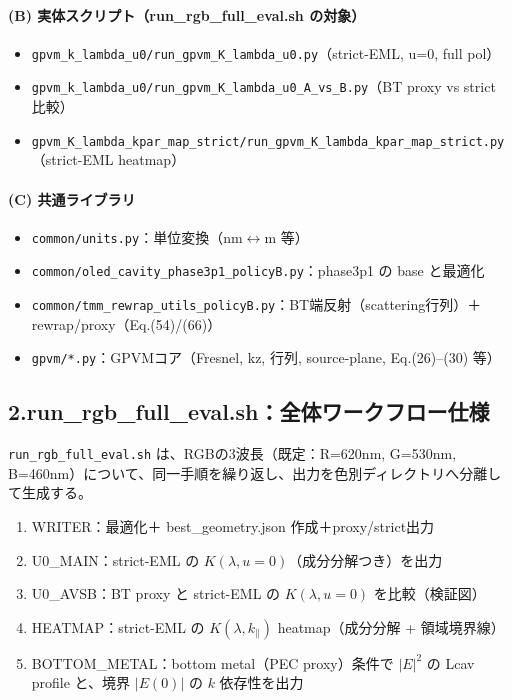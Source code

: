\documentclass[a4paper,11pt]{jsarticle} %
\begin{document}
\paragraph{(B) 実体スクリプト（run\_rgb\_full\_eval.sh の対象）}
\begin{itemize}
\item \texttt{gpvm\_k\_lambda\_u0/run\_gpvm\_K\_lambda\_u0.py}（strict-EML, u=0, full pol）
\item \texttt{gpvm\_k\_lambda\_u0/run\_gpvm\_K\_lambda\_u0\_A\_vs\_B.py}（BT proxy vs strict 比較）
\item \texttt{gpvm\_K\_lambda\_kpar\_map\_strict/run\_gpvm\_K\_lambda\_kpar\_map\_strict.py}（strict-EML heatmap）
\end{itemize}

\paragraph{(C) 共通ライブラリ}
\begin{itemize}
\item \texttt{common/units.py}：単位変換（nm$\leftrightarrow$m 等）
\item \texttt{common/oled\_cavity\_phase3p1\_policyB.py}：phase3p1 の base と最適化
\item \texttt{common/tmm\_rewrap\_utils\_policyB.py}：BT端反射（scattering行列）＋rewrap/proxy（Eq.(54)/(66)）
\item \texttt{gpvm/*.py}：GPVMコア（Fresnel, kz, 行列, source-plane, Eq.(26)--(30) 等）
\end{itemize}

\subsection*{2.\;run\_rgb\_full\_eval.sh：全体ワークフロー仕様}
\texttt{run\_rgb\_full\_eval.sh} は、RGBの3波長（既定：R=620nm, G=530nm, B=460nm）について、同一手順を繰り返し、出力を色別ディレクトリへ分離して生成する。
\begin{enumerate}
\item WRITER：最適化＋ best\_geometry.json 作成＋proxy/strict出力
\item U0\_MAIN：strict-EML の $K(\lambda,u=0)$（成分分解つき）を出力
\item U0\_AVSB：BT proxy と strict-EML の $K(\lambda,u=0)$ を比較（検証図）
\item HEATMAP：strict-EML の $K(\lambda,k_\parallel)$ heatmap（成分分解 + 領域境界線）
\item BOTTOM\_METAL：bottom metal（PEC proxy）条件で $|E|^2$ の Lcav profile と、境界 $|E(0)|$ の $k$ 依存性を出力
\end{enumerate}
\end{document}
